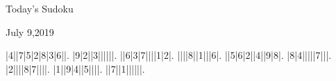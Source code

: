 \documentclass{article}
\begin{document}
\begin{center}
\Huge{Today's Sudoku}
\end{center}
\begin{center}
\Large{July 9,2019}
\end{center}
\begin{sudoku}
|4||7|5|2|8|3|6||.
|9|2||3||||||.
||6|3|7||||1|2|.
||||8||1|||6|.
||5|6|2||4||9|8|.
|8|4|||||7|||.
|2||||8|7||||.
|1||9|4||5||||.
||7||1||||||.
\end{sudoku}
\end{document}
